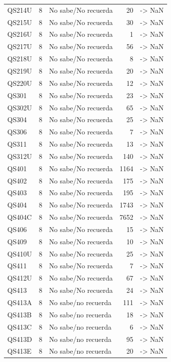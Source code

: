 \begin{longtable}{lllrl}
QS214U & 8 & No sabe/No recuerda & 20 & -> NaN \\
QS215U & 8 & No sabe/No recuerda & 30 & -> NaN \\
QS216U & 8 & No sabe/No recuerda & 1 & -> NaN \\
QS217U & 8 & No sabe/No recuerda & 56 & -> NaN \\
QS218U & 8 & No sabe/No recuerda & 8 & -> NaN \\
QS219U & 8 & No sabe/No recuerda & 20 & -> NaN \\
QS220U & 8 & No sabe/No recuerda & 12 & -> NaN \\
QS301 & 8 & No sabe/No recuerda & 23 & -> NaN \\
QS302U & 8 & No sabe/No recuerda & 65 & -> NaN \\
QS304 & 8 & No sabe/No recuerda & 25 & -> NaN \\
QS306 & 8 & No sabe/No recuerda & 7 & -> NaN \\
QS311 & 8 & No sabe/No recuerda & 13 & -> NaN \\
QS312U & 8 & No sabe/No recuerda & 140 & -> NaN \\
QS401 & 8 & No sabe/No recuerda & 1164 & -> NaN \\
QS402 & 8 & No sabe/No recuerda & 175 & -> NaN \\
QS403 & 8 & No sabe/No recuerda & 195 & -> NaN \\
QS404 & 8 & No sabe/No recuerda & 1743 & -> NaN \\
QS404C & 8 & No sabe/No recuerda & 7652 & -> NaN \\
QS406 & 8 & No sabe/No recuerda & 15 & -> NaN \\
QS409 & 8 & No sabe/No recuerda & 10 & -> NaN \\
QS410U & 8 & No sabe/No recuerda & 25 & -> NaN \\
QS411 & 8 & No sabe/No recuerda & 7 & -> NaN \\
QS412U & 8 & No sabe/No recuerda & 67 & -> NaN \\
QS413 & 8 & No sabe/No recuerda & 24 & -> NaN \\
QS413A & 8 & No sabe/no recuerda & 111 & -> NaN \\
QS413B & 8 & No sabe/no recuerda & 18 & -> NaN \\
QS413C & 8 & No sabe/no recuerda & 6 & -> NaN \\
QS413D & 8 & No sabe/no recuerda & 95 & -> NaN \\
QS413E & 8 & No sabe/no recuerda & 20 & -> NaN \\

\end{longtable}
